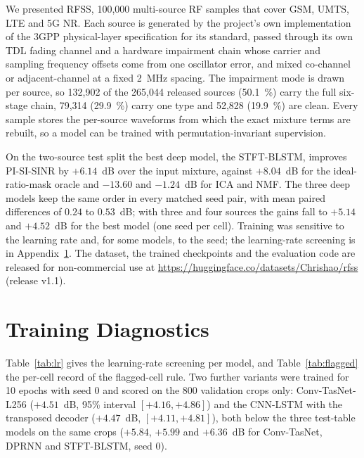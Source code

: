 \documentclass[journal]{IEEEtran}
\begin{document}
We presented RFSS, 100,000 multi-source RF samples that cover GSM, UMTS, LTE and
5G NR. Each source is generated by the project's own implementation of the 3GPP
physical-layer specification for its standard, passed through its own TDL
fading channel and a hardware impairment chain whose carrier and
sampling frequency offsets come from one oscillator error, and mixed co-channel
or adjacent-channel at a fixed 2~MHz spacing. The impairment mode is drawn per
source, so 132,902 of the 265,044 released sources (50.1~\%) carry the full
six-stage chain, 79,314 (29.9~\%) carry one type and 52,828 (19.9~\%) are clean.
Every sample stores the per-source waveforms from which the exact mixture terms are
rebuilt, so a model can be trained with permutation-invariant supervision.

On the two-source test split the best deep model, the STFT-BLSTM, improves PI-SI-SINR by $+6.14$~dB
over the input mixture, against $+8.04$~dB for the ideal-ratio-mask oracle
and $-13.60$ and $-1.24$~dB for ICA and NMF. The three deep models keep the same order in every matched seed pair, with mean
paired differences of $0.24$ to $0.53$~dB; with three and four sources the gains fall to $+5.14$ and $+4.52$~dB for the best model
(one seed per cell). Training was sensitive to the
learning rate and, for some models, to the seed; the learning-rate screening is in
Appendix~\ref{app:training}. The dataset, the trained checkpoints and the
evaluation code are released for non-commercial use at
\url{https://huggingface.co/datasets/Chrishao/rfss} (release v1.1).

\appendix

\section{Training Diagnostics}
\label{app:training}

Table~\ref{tab:lr} gives the learning-rate screening per model, and
Table~\ref{tab:flagged} the per-cell record of the flagged-cell rule. Two further
variants were trained for 10 epochs with seed 0 and scored on the 800 validation
crops only: Conv-TasNet-L256 ($+4.51$~dB, 95\% interval $[+4.16,+4.86]$) and the
CNN-LSTM with the transposed decoder ($+4.47$~dB, $[+4.11,+4.81]$), both below the
three test-table models on the same crops ($+5.84$, $+5.99$ and $+6.36$~dB for
Conv-TasNet, DPRNN and STFT-BLSTM, seed 0).
\end{document}
